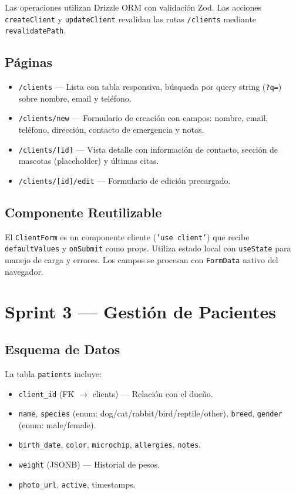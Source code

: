 \documentclass[12pt,a4paper]{article}
\begin{document}
Las operaciones utilizan Drizzle ORM con validación Zod. Las acciones
\texttt{createClient} y \texttt{updateClient} revalidan las rutas
\texttt{/clients} mediante \texttt{revalidatePath}.

\subsection{Páginas}

\begin{itemize}[leftmargin=*]
    \item \texttt{/clients} --- Lista con tabla responsiva, búsqueda por
          query string (\texttt{?q=}) sobre nombre, email y teléfono.
    \item \texttt{/clients/new} --- Formulario de creación con campos:
          nombre, email, teléfono, dirección, contacto de emergencia y notas.
    \item \texttt{/clients/[id]} --- Vista detalle con información de
          contacto, sección de mascotas (placeholder) y últimas citas.
    \item \texttt{/clients/[id]/edit} --- Formulario de edición precargado.
\end{itemize}

\subsection{Componente Reutilizable}

El \texttt{ClientForm} es un componente cliente (\texttt{'use client'}) que
recibe \texttt{defaultValues} y \texttt{onSubmit} como props. Utiliza estado
local con \texttt{useState} para manejo de carga y errores. Los campos se
procesan con \texttt{FormData} nativo del navegador.

\section{Sprint 3 --- Gestión de Pacientes}

\subsection{Esquema de Datos}

La tabla \texttt{patients} incluye:

\begin{itemize}[leftmargin=*]
    \item \texttt{client\_id} (FK $\to$ clients) --- Relación con el dueño.
    \item \texttt{name}, \texttt{species} (enum: dog/cat/rabbit/bird/reptile/other),
          \texttt{breed}, \texttt{gender} (enum: male/female).
    \item \texttt{birth\_date}, \texttt{color}, \texttt{microchip},
          \texttt{allergies}, \texttt{notes}.
    \item \texttt{weight} (JSONB) --- Historial de pesos.
    \item \texttt{photo\_url}, \texttt{active}, timestamps.
\end{itemize}
\end{document}
